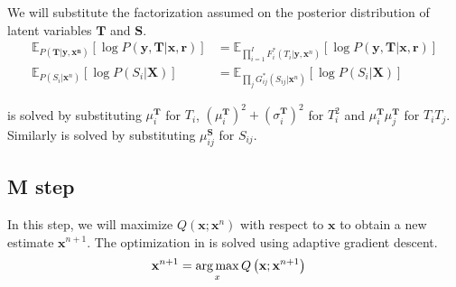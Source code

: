 We will substitute the factorization assumed on the posterior distribution of latent variables $\mathbf{T}$ and $\mathbf{S}$.
\begin{align}
\mathbb{E}_{P( \mathbf{T} | \mathbf{y}, \mathbf{x^n})} \left[ \log P \left( \mathbf{y}, \mathbf{T} | \mathbf{x}, \mathbf{r} \right) \right] &= \mathbb{E}_{ \prod_{i=1}^{I} F^*_i (T_i | \mathbf{y}, \mathbf{x}^n) } \left[ \log P \left( \mathbf{y}, \mathbf{T} | \mathbf{x}, \mathbf{r} \right) \right] \label{eqn:subFactorT} \\
%
\mathbb{E}_{ P \left( S_i | \mathbf{x}^n \right)} \left[ \log P \left( S_i | \mathbf{X} \right) \right] &= \mathbb{E}_{ \prod_{j} G^*_{ij} \left( S_{ij} | \mathbf{x}^n \right) } \left[ \log P \left( S_i | \mathbf{X} \right) \right] \label{eqn:subFactorS}
\end{align}

 is solved by substituting $\mu^\mathbf{T}_i$ for $T_i$, $\left( \mu^\mathbf{T}_i \right)^2 + \left( \sigma^\mathbf{T}_i \right)^2$ for $T_i^2$ and $\mu^\mathbf{T}_i \mu^\mathbf{T}_j $ for $T_i T_j$. Similarly  is solved by substituting $\mu^\mathbf{S}_{ij}$ for $S_{ij}$.


\subsection{M step}
In this step, we will maximize $Q(\mathbf{x}; \mathbf{x}^n)$ with respect to $\mathbf{x}$ to obtain a new estimate $\mathbf{x}^{n+1}$. The optimization in  is solved using adaptive gradient descent.
\begin{align}
    \mathbf{x}^{n+1} &= \operatorname*{arg\,max}_{x} Q \left( \mathbf{x}; \mathbf{x}^{n+1} \right) \label{eqn:mStep}
\end{align}




